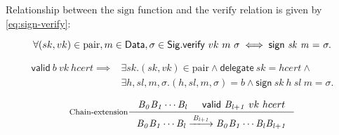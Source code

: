 \documentclass[11pt,a4paper]{article}
\newcommand{\var}[1]{\mathit{#1}}
\newcommand{\fun}[1]{\mathsf{#1}}
\newcommand{\type}[1]{\mathsf{#1}}
\newcommand{\trans}[2]{\xlongrightarrow[\textsc{#1}]{#2}}
\newcommand{\nextdef}{\\[1em]}
\newcommand{\Sig}{\type{Sig}}
\newcommand{\Data}{\type{Data}}
\newcommand{\signname}{sign}
\newcommand{\verifyname}{verify}
\newcommand{\delegatename}{delegate}
\newcommand{\validname}{valid}
\newcommand{\keypairname}{pair}
\newcommand{\sign}[4]{\fun{\signname}\ \var{#1} ~ \var{#2} ~ \var{#3} ~ \var{#4}}
\newcommand{\verify}[3]{\fun{\verifyname} ~ #1 ~ #2 ~ #3}
\newcommand{\delegate}[1]{\fun{\delegatename}\ \var{#1}}
\newcommand{\valid}[3]{\fun{\validname} ~ #1 ~ #2 ~ #3}
\begin{document}
Relationship between the $\text{\signname}$ function and the
$\text{\verifyname}$ relation is given by \ref{eq:sign-verify}:

\begin{equation}
  \label{eq:sign-verify}
  \forall (sk, vk) \in \text{\keypairname}, m \in \Data, \sigma \in \Sig.\\
  \nextdef
  \verify{vk}{m}{\sigma} \iff \sign{sk}{m} = \sigma.
\end{equation}

  \begin{align*}
  \label{eq:valid-block}
    \valid{b}{vk}{hcert} \implies &
      \exists sk. (sk, vk) \in \text{\keypairname} \wedge
      \delegate{sk} = hcert \wedge \\
      & \exists h, sl, m, \sigma. (h, sl, m, \sigma) = b \wedge
        \sign{sk}{h}{sl}{m} = \sigma.
  \end{align*}

\begin{equation}
  \label{eq:chain-extension}
  \inference[Chain-extension]
  {\var{B_0}\var{B_1}\cdots\var{B_l} & \valid{\var{B_{l+1}}}{vk}{hcert}
  }
  {{\var{B_0}\var{B_1}\cdots\var{B_l}} \trans{}{\var{B_{l+1}}} {\var{B_0}\var{B_1}\cdots\var{B_l}\var{B_{l+1}}}}
\end{equation}
\end{document}
